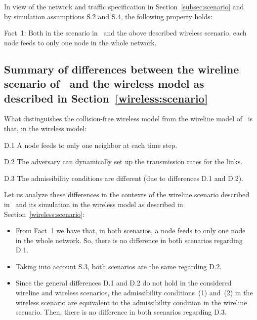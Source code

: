 \documentclass[journal,twocolumn]{./IEEEtran}
\begin{document}
In view of the network and traffic specification in Section~\ref{subsec:scenario} and by simulation assumptions S.2 and S.4, the following property holds:
\begin{description}
\item{Fact~1:}
Both in the scenario in~\cite{DBLP:journals/ton/BennettBCCB02} and the above described wireless scenario, each node feeds to  only  one node in the whole network.
\end{description}



\subsection{Summary of differences between the wireline scenario of~\cite{DBLP:journals/ton/BennettBCCB02} and the wireless model as described in Section~\ref{wireless:scenario}}

What distinguishes the collision-free wireless model from the wireline model of~\cite{DBLP:journals/ton/BennettBCCB02} is that, in the wireless model:
\begin{description}
\item{D.1}
A node feeds to only one neighbor at each time step.
\item{D.2}
The adversary can dynamically set up the transmission rates for the links.
\item{D.3}
The admissibility conditions are different (due to differences D.1 and D.2).
\end{description}


Let us analyze these differences in the contexts of the wireline scenario described in~\cite{DBLP:journals/ton/BennettBCCB02} and its simulation in the wireless model as described in Section~\ref{wireless:scenario}:
\begin{itemize}
\item
From Fact~1 we have that, in both scenarios, a node feeds to only one node in the whole network. So, there is no difference in both scenarios regarding D.1.
\item
Taking into account S.3, both scenarios are the same regarding D.2.
\item
Since the general differences D.1 and D.2 do not hold in the considered wireline and wireless scenarios, the admissibility conditions~(1) and~(2) in the wireless scenario are equivalent to the admissibility condition in the wireline scenario. Then,  there is no difference in both scenarios regarding D.3.
\end{itemize}
\end{document}

